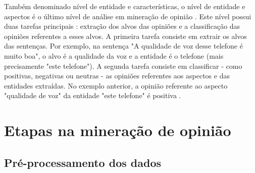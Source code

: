 \documentclass[template.tex]{subfiles}
\begin{document}
Também denominado nível de entidade e características, o nível de entidade e aspectos é o último nível de análise em mineração de opinião \cite{bing:2012}. Este nível possui duas tarefas principais \cite{bing:2012}: extração dos alvos das opiniões e a classificação das opiniões referentes a esses alvos. A primeira tarefa consiste em extrair os alvos das sentenças. Por exemplo, na sentença "A qualidade de voz desse telefone é muito boa", o alvo é a qualidade da voz e a entidade é o telefone (mais precisamente "este telefone"). A segunda tarefa consiste em classificar - como positivas, negativas ou neutras - as opiniões referentes aos aspectos e das entidades extraídas. No exemplo anterior, a opinião referente ao aspecto "qualidade de voz" da entidade "este telefone" é positiva \cite{bing:2012}.


\section{Etapas na mineração de opinião}


\subsection{Pré-processamento dos dados}
\end{document}
